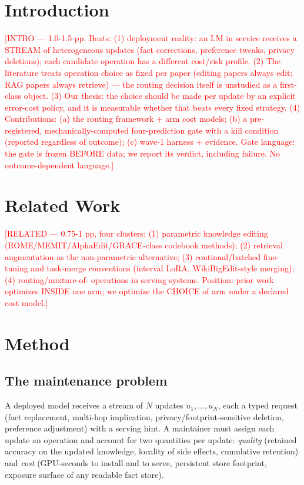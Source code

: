 \documentclass[preprint,12pt]{elsarticle}
\newcommand{\todoslot}[1]{\textcolor{red}{[#1]}}
\begin{document}
\section{Introduction}
\label{sec:intro}

\todoslot{INTRO — 1.0-1.5 pp. Beats: (1) deployment reality: an LM in service receives
a STREAM of heterogeneous updates (fact corrections, preference tweaks, privacy
deletions); each candidate operation has a different cost/risk profile.
(2) The literature treats operation choice as fixed per paper (editing papers always
edit; RAG papers always retrieve) — the routing decision itself is unstudied as a
first-class object. (3) Our thesis: the choice should be made per update by an
explicit error-cost policy, and it is measurable whether that beats every fixed
strategy. (4) Contributions: (a) the routing framework + arm cost models;
(b) a pre-registered, mechanically-computed four-prediction gate with a kill
condition (reported regardless of outcome); (c) wave-1 harness + evidence.
Gate language: the gate is frozen BEFORE data; we report its verdict, including
failure. No outcome-dependent language.}

\section{Related Work}
\label{sec:related}

\todoslot{RELATED — 0.75-1 pp, four clusters: (1) parametric knowledge editing
(ROME/MEMIT/AlphaEdit/GRACE-class codebook methods); (2) retrieval augmentation as
the non-parametric alternative; (3) continual/batched fine-tuning and task-merge
conventions (interval LoRA, WikiBigEdit-style merging); (4) routing/mixture-of-
operations in serving systems. Position: prior work optimizes INSIDE one arm; we
optimize the CHOICE of arm under a declared cost model.}

\section{Method}
\label{sec:method}

\subsection{The maintenance problem}
A deployed model receives a stream of $N$ updates $u_1,\dots,u_N$, each a typed
request (fact replacement, multi-hop implication, privacy/footprint-sensitive
deletion, preference adjustment) with a serving hint. A maintainer must assign each
update an operation and account for two quantities per update: \emph{quality}
(retained accuracy on the updated knowledge, locality of side effects, cumulative
retention) and \emph{cost} (GPU-seconds to install and to serve, persistent store
footprint, exposure surface of any readable fact store).
\end{document}
